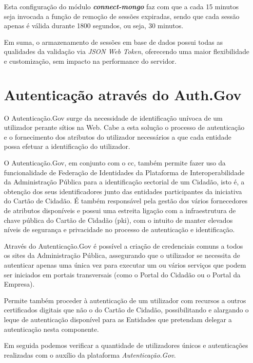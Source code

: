 Esta configuração do módulo \emph{\textbf{connect-mongo}} faz com que a cada 15 minutos seja invocada a função de remoção de sessões expiradas, sendo que cada sessão apenas é válida durante 1800 segundos, ou seja, 30 minutos.

Em suma, o armazenamento de sessões em base de dados possui todas as qualidades da validação via \emph{JSON Web Token}, oferecendo uma maior flexibilidade e customização, sem impacto na performance do servidor.

\cleardoublepage
\section{Autenticação através do Auth.Gov}

O Autenticação.Gov surge da necessidade de identificação unívoca de um utilizador perante sítios na Web. Cabe a esta solução o processo de autenticação e o fornecimento dos atributos do utilizador necessários a que cada entidade possa efetuar a identificação do utilizador.

O Autenticação.Gov, em conjunto com o \gls{cc}, também permite fazer uso da funcionalidade de Federação de Identidades da Plataforma de Interoperabilidade da Administração Pública para a identificação sectorial de um Cidadão, isto é, a obtenção dos seus identificadores junto das entidades participantes da iniciativa do Cartão de Cidadão. É também responsável pela gestão dos vários fornecedores de atributos disponíveis e possui uma estreita ligação com a infraestrutura de chave pública do Cartão de Cidadão (\gls{pki}), com o intuito de manter elevados níveis de segurança e privacidade no processo de autenticação e identificação.

Através do Autenticação.Gov é possível a criação de credenciais comuns a todos os sites da Administração Pública, assegurando que o utilizador se necessita de autenticar apenas uma única vez para executar um ou vários serviços que podem ser iniciados em portais transversais (como o Portal do Cidadão ou o Portal da Empresa).

Permite também proceder à autenticação de um utilizador com recursos a outros certificados digitais que não o do Cartão de Cidadão, possibilitando e alargando o leque de autenticação disponível para as Entidades que pretendam delegar a autenticação nesta componente.

Em seguida podemos verificar a quantidade de utilizadores únicos e autenticações realizadas com o auxílio da plataforma \emph{Autenticação.Gov}.

